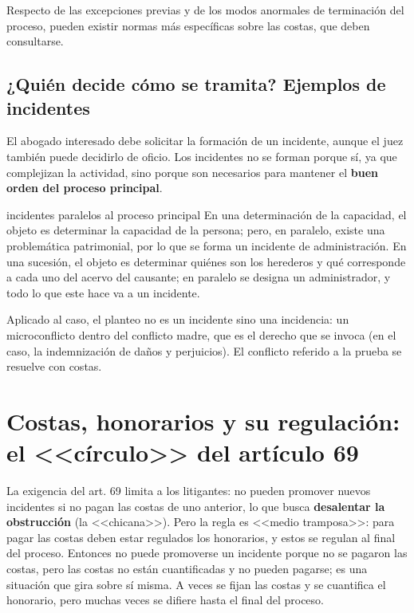 \documentclass[12pt,oneside]{book}
\begin{document}

Respecto de las excepciones previas y de los modos anormales de terminación del proceso, pueden existir normas más específicas sobre las costas, que deben consultarse.

\subsection{¿Quién decide cómo se tramita? Ejemplos de incidentes}

El abogado interesado debe solicitar la formación de un incidente, aunque el juez también puede decidirlo de oficio. Los incidentes no se forman porque sí, ya que complejizan la actividad, sino porque son necesarios para mantener el \textbf{buen orden del proceso principal}.

\begin{example}{incidentes paralelos al proceso principal}
En una determinación de la capacidad, el objeto es determinar la capacidad de la persona; pero, en paralelo, existe una problemática patrimonial, por lo que se forma un incidente de administración. En una sucesión, el objeto es determinar quiénes son los herederos y qué corresponde a cada uno del acervo del causante; en paralelo se designa un administrador, y todo lo que este hace va a un incidente.
\end{example}

Aplicado al caso, el planteo no es un incidente sino una incidencia: un microconflicto dentro del conflicto madre, que es el derecho que se invoca (en el caso, la indemnización de daños y perjuicios). El conflicto referido a la prueba se resuelve con costas.

\section{Costas, honorarios y su regulación: el <<círculo>> del artículo 69}

La exigencia del art. 69 limita a los litigantes: no pueden promover nuevos incidentes si no pagan las costas de uno anterior, lo que busca \textbf{desalentar la obstrucción} (la <<chicana>>). Pero la regla es <<medio tramposa>>: para pagar las costas deben estar regulados los honorarios, y estos se regulan al final del proceso. Entonces no puede promoverse un incidente porque no se pagaron las costas, pero las costas no están cuantificadas y no pueden pagarse; es una situación que gira sobre sí misma. A veces se fijan las costas y se cuantifica el honorario, pero muchas veces se difiere hasta el final del proceso.
\end{document}
